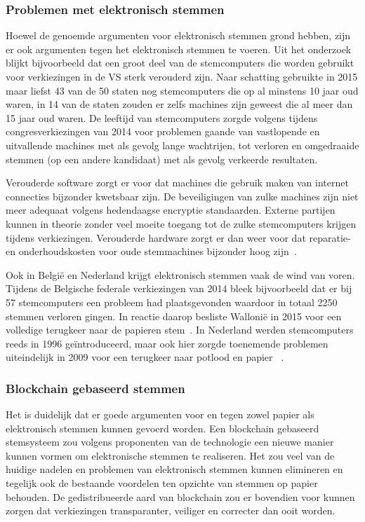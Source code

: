 			\subsubsection{Problemen met elektronisch stemmen}
			Hoewel de genoemde argumenten voor elektronisch stemmen grond hebben, zijn er ook argumenten tegen het elektronisch stemmen te voeren. Uit het onderzoek \cite{Norden2015} blijkt bijvoorbeeld dat een groot deel van de stemcomputers die worden gebruikt voor verkiezingen in de VS sterk verouderd zijn. Naar schatting gebruikte in 2015 maar liefst 43 van de 50 staten nog stemcomputers die op al minstens 10 jaar oud waren, in 14 van de staten zouden er zelfs machines zijn geweest die al meer dan 15 jaar oud waren. De leeftijd van stemcomputers zorgde volgens \cite{Norden2015} tijdens  congresverkiezingen van 2014 voor problemen gaande van vastlopende en uitvallende machines met als gevolg  lange wachtrijen, tot verloren en omgedraaide stemmen (op een andere kandidaat) met als gevolg verkeerde resultaten.
			
			Verouderde software zorgt er voor dat machines die gebruik maken van internet connecties bijzonder kwetsbaar zijn. De beveiligingen van zulke machines zijn niet meer adequaat volgens hedendaagse encryptie standaarden. Externe partijen kunnen in theorie zonder veel moeite toegang tot de zulke stemcomputers krijgen tijdens verkiezingen. Verouderde hardware zorgt er dan weer voor dat reparatie- en onderhoudskosten voor oude stemmachines bijzonder hoog zijn~\autocite{Norden2015}.
			
			Ook in België en Nederland krijgt elektronisch stemmen vaak de wind van voren. Tijdens de Belgische federale verkiezingen van 2014 bleek bijvoorbeeld dat er bij 57 stemcomputers een probleem had plaatsgevonden waardoor in totaal 2250 stemmen verloren gingen. In reactie daarop besliste Wallonië in 2015 voor een volledige terugkeer naar de papieren stem~\autocite{Maddens2018}.  In Nederland werden stemcomputers reeds in 1996 geïntroduceerd, maar ook hier zorgde toenemende problemen uiteindelijk in 2009 voor een terugkeer naar potlood en papier ~\autocite{Schellevis2018}.
			
			\subsubsection{Blockchain gebaseerd stemmen}
			Het is duidelijk dat er goede argumenten voor en tegen zowel papier als elektronisch stemmen kunnen gevoerd worden. Een blockchain gebaseerd stemsysteem zou volgens proponenten van de technologie een nieuwe manier kunnen vormen om elektronische stemmen te realiseren. Het zou veel van de huidige nadelen en problemen van elektronisch stemmen kunnen elimineren  en tegelijk ook de bestaande voordelen ten opzichte van stemmen op papier behouden. De gedistribueerde aard van blockchain zou er bovendien voor kunnen zorgen dat verkiezingen transparanter, veiliger en correcter dan ooit worden. 
			 
